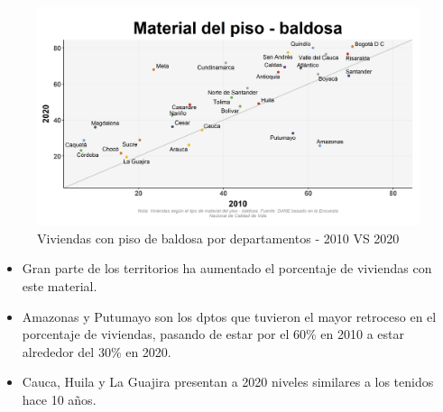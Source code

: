     \begin{figure}[H]
        \caption{Viviendas con piso de baldosa por departamentos - 2010 VS 2020 \label{map_result_2} }
        \begin{center}
        \includegraphics[width=\textwidth,keepaspectratio]{img/var_173_scatter_time.png}
        \end{center}
    \end{figure}
            \begin{itemize}
                    \item Gran parte de los territorios ha aumentado el porcentaje de viviendas con este material.
                    \item Amazonas y Putumayo son los dptos que tuvieron el mayor retroceso en el porcentaje de viviendas, pasando de estar por el 60\% en 2010 a estar alrededor del 30\% en 2020.
                    \item Cauca, Huila y La Guajira presentan a 2020 niveles similares a los tenidos hace 10 años.
                    \end{itemize}

